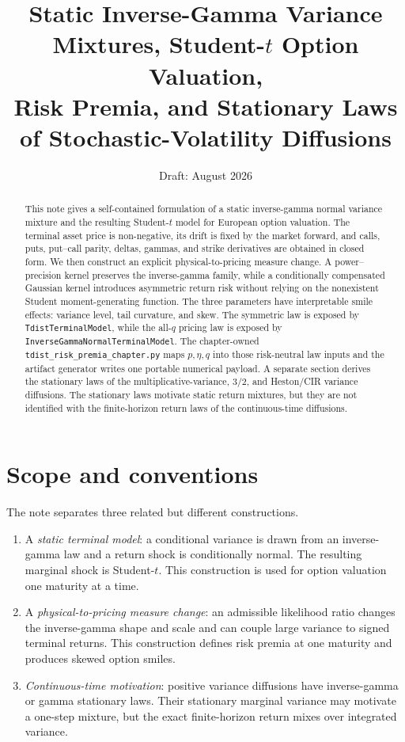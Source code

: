 \documentclass[11pt,a4paper]{article}
\title{Static Inverse-Gamma Variance Mixtures, Student-$t$ Option Valuation,\\
Risk Premia, and Stationary Laws of Stochastic-Volatility Diffusions}
\author{}
\date{Draft: August 2026}
\begin{document}
\maketitle

\begin{abstract}
This note gives a self-contained formulation of a static inverse-gamma normal
variance mixture and the resulting Student-$t$ model for European option
valuation.  The terminal asset price is non-negative, its drift is fixed by the
market forward, and calls, puts, put--call parity, deltas, gammas, and strike
derivatives are obtained in closed form.  We then construct an explicit
physical-to-pricing measure change.  A power--precision kernel preserves the
inverse-gamma family, while a conditionally compensated Gaussian kernel
introduces asymmetric return risk without relying on the nonexistent Student
moment-generating function.  The three parameters have interpretable smile
effects: variance level, tail curvature, and skew.  The symmetric law is exposed
by \texttt{TdistTerminalModel}, while the all-$q$ pricing law is exposed by
\texttt{InverseGammaNormalTerminalModel}.  The chapter-owned
\texttt{tdist\_risk\_premia\_chapter.py} maps $p,\eta,q$ into those risk-neutral
law inputs and the artifact generator writes one portable numerical payload.
A separate section derives the stationary laws of the
multiplicative-variance, $3/2$, and Heston/CIR variance diffusions.  The
stationary laws motivate static return mixtures, but they are not identified
with the finite-horizon return laws of the continuous-time diffusions.
\end{abstract}

\tableofcontents

\section{Scope and conventions}

The note separates three related but different constructions.
\begin{enumerate}
    \item A \emph{static terminal model}: a conditional variance is drawn from
    an inverse-gamma law and a return shock is conditionally normal.  The
    resulting marginal shock is Student-$t$.  This construction is used for
    option valuation one maturity at a time.
    \item A \emph{physical-to-pricing measure change}: an admissible likelihood
    ratio changes the inverse-gamma shape and scale and can couple large
    variance to signed terminal returns.  This construction defines risk
    premia at one maturity and produces skewed option smiles.
    \item \emph{Continuous-time motivation}: positive variance diffusions have
    inverse-gamma or gamma stationary laws.  Their stationary
    marginal variance may motivate a one-step mixture, but the exact
    finite-horizon return mixes over integrated variance.
\end{enumerate}
\end{document}
